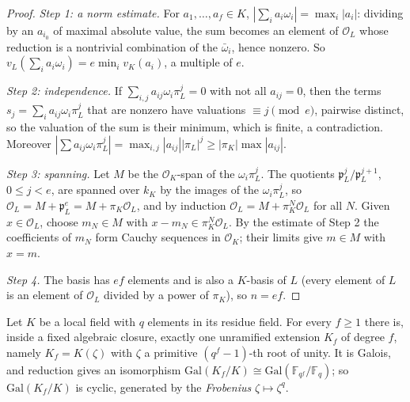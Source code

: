 \begin{proof}
\emph{Step 1: a norm estimate.} For $a_1, \dots, a_f \in K$, $|\sum_ia_i\omega_i| = \max_i|a_i|$: dividing by an $a_{i_0}$ of maximal absolute value, the sum becomes an element of $\mathcal{O}_L$ whose reduction is a
nontrivial combination of the $\bar\omega_i$, hence nonzero. So $v_L(\sum_ia_i\omega_i) = e\min_iv_K(a_i)$, a multiple of $e$.

\emph{Step 2: independence.} If $\sum_{i,j}a_{ij}\omega_i\pi_L^j = 0$ with not all $a_{ij} = 0$, then the terms $s_j = \sum_ia_{ij}\omega_i\pi_L^j$ that are nonzero have valuations $\equiv j \pmod e$, pairwise
distinct, so the valuation of the sum is their minimum, which is finite, a contradiction. Moreover $|\sum a_{ij}\omega_i\pi_L^j| = \max_{i,j}|a_{ij}||\pi_L|^j \geq |\pi_K|\max|a_{ij}|$.

\emph{Step 3: spanning.} Let $M$ be the $\mathcal{O}_K$-span of the $\omega_i\pi_L^j$. The quotients $\mathfrak{p}_L^j/\mathfrak{p}_L^{j+1}$, $0 \leq j < e$, are spanned over $k_K$ by the images of the
$\omega_i\pi_L^j$, so $\mathcal{O}_L = M + \mathfrak{p}_L^e = M + \pi_K\mathcal{O}_L$, and by induction $\mathcal{O}_L = M + \pi_K^N\mathcal{O}_L$ for all $N$. Given $x \in \mathcal{O}_L$, choose $m_N \in M$ with
$x - m_N \in \pi_K^N\mathcal{O}_L$. By the estimate of Step 2 the coefficients of $m_N$ form Cauchy sequences in $\mathcal{O}_K$; their limits give $m \in M$ with $x = m$.

\emph{Step 4.} The basis has $ef$ elements and is also a $K$-basis of $L$ (every element of $L$ is an element of $\mathcal{O}_L$ divided by a power of $\pi_K$), so $n = ef$.
\end{proof}

\begin{theorem}\label{local-fields:theorem-unramified}
Let $K$ be a local field with $q$ elements in its residue field. For every $f \geq 1$ there is, inside a fixed algebraic closure, exactly one unramified extension $K_f$ of degree $f$, namely
$K_f = K(\zeta)$ with $\zeta$ a primitive $(q^f - 1)$-th root of unity. It is Galois, and reduction gives an isomorphism $\mathrm{Gal}(K_f/K) \cong \mathrm{Gal}(\mathbb{F}_{q^f}/\mathbb{F}_q)$; so
$\mathrm{Gal}(K_f/K)$ is cyclic, generated by the \emph{Frobenius} $\zeta \mapsto \zeta^q$.
\end{theorem}


